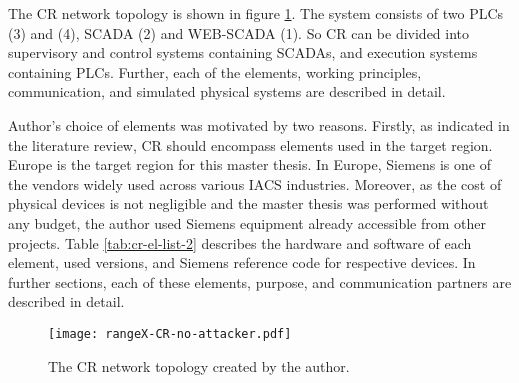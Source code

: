 The CR network topology is shown in figure \ref{fig:cr-network-topology}. The system consists of two PLCs (3) and (4), SCADA (2) and WEB-SCADA (1). So CR can be divided into supervisory and control systems containing SCADAs, and execution systems containing PLCs. Further, each of the elements, working principles, communication, and simulated physical systems are described in detail.

Author’s choice of elements was motivated by two reasons. Firstly, as indicated in the literature review, CR should encompass elements used in the target region. Europe is the target region for this master thesis. In Europe, Siemens is one of the vendors widely used across various IACS industries. Moreover, as the cost of physical devices is not negligible and the master thesis was performed without any budget, the author used  Siemens equipment already accessible from other projects. Table \ref{tab:cr-el-list-2} describes the hardware and software of each element, used versions, and Siemens reference code for respective devices. In further sections, each of these elements, purpose, and communication partners are described in detail.

\begin{figure}[htb]
	\texttt{[image: rangeX-CR-no-attacker.pdf]}
	\caption{The CR network topology created by the author.}
	\label{fig:cr-network-topology}
\end{figure} 


